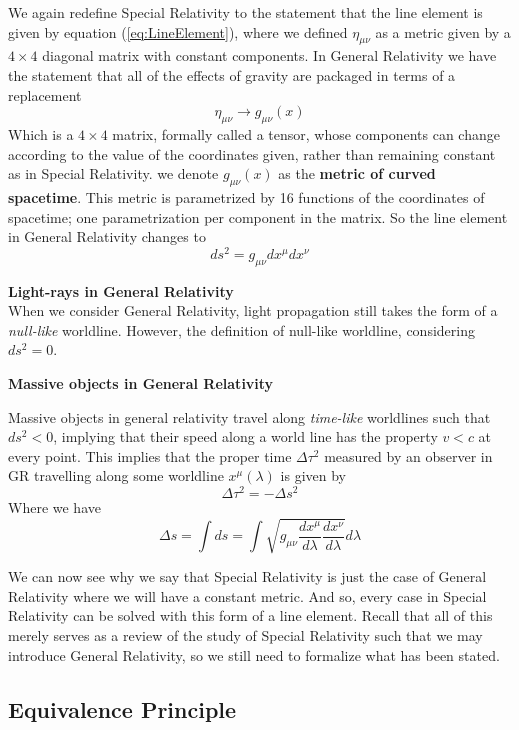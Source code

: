 \documentclass{article}
\begin{document}
 		We again redefine Special Relativity to the statement that the line element is given by equation (\ref{eq:LineElement}), where we defined $\eta_{\mu\nu}$ as a metric given by a $4\times4$ diagonal matrix with constant components. In General Relativity we have the statement that all of the effects of gravity are packaged in terms of a replacement 
 		$$ \eta_{\mu\nu} \to g_{\mu \nu} (x)$$
 		Which is a $4\times4$ matrix, formally called a tensor, whose components can change according to the value of the coordinates given, rather than remaining constant as in Special Relativity. we denote $g_{\mu \nu}(x)$ as the \textbf{metric of curved spacetime}. This metric is parametrized by 16 functions of the coordinates of spacetime; one parametrization per component in the matrix. So the line element in General Relativity changes to
 		$$ ds^2 = g_{\mu\nu} dx^\mu dx^\nu$$
 		\begin{exmp}
 			\textbf{Light-rays in General Relativity}\\
 			
 			When we consider General Relativity, light propagation still takes the form of a \textit{null-like} worldline. However, the definition of null-like worldline, considering $ds^2 = 0$.
 		\end{exmp}
 		\begin{exmp}
 			\textbf{Massive objects in General Relativity}
 			
 			Massive objects in general relativity travel along \textit{time-like} worldlines such that $ds^2 < 0$, implying that their speed along a world line has the property $v<c$ at every point. This implies that the proper time $\Delta \tau^2$ measured by an observer in GR travelling along some worldline $x^\mu (\lambda)$ is given by
 			$$ \Delta \tau^2 = - \Delta s^2$$
 			Where we have
 			$$ \Delta s = \int ds = \int \sqrt{g_{\mu\nu} \frac{dx^\mu}{d\lambda} \frac{dx^\nu}{d\lambda}}d\lambda$$
 		
 		\end{exmp}
 	\pagebreak
 		We can now see why we say that Special Relativity is just the case of General Relativity where we will have a constant metric. And so, every case in Special Relativity can be solved with this form of a line element. Recall that all of this merely serves as a review of the study of Special Relativity such that we may introduce General Relativity, so we still need to formalize what has been stated.
 		
 		\subsection{Equivalence Principle}
 		
\end{document}
